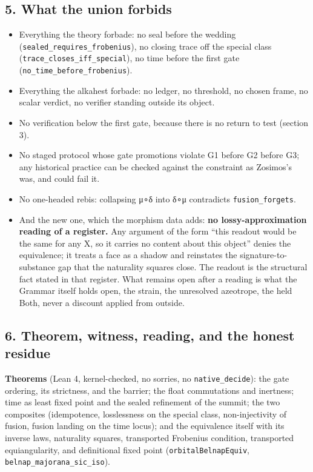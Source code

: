 \documentclass[12pt,a4paper]{article}
\begin{document}
\hypertarget{what-the-union-forbids}{%
\subsection{5. What the union forbids}\label{what-the-union-forbids}}

\begin{itemize}
\tightlist
\item
  Everything the theory forbade: no seal before the wedding
  (\texttt{sealed\_requires\_frobenius}), no closing trace off the
  special class (\texttt{trace\_closes\_iff\_special}), no time before
  the first gate (\texttt{no\_time\_before\_frobenius}).
\item
  Everything the alkahest forbade: no ledger, no threshold, no chosen
  frame, no scalar verdict, no verifier standing outside its object.
\item
  No verification below the first gate, because there is no return to
  test (section 3).
\item
  No staged protocol whose gate promotions violate G1 before G2 before
  G3; any historical practice can be checked against the constraint as
  Zosimos's was, and could fail it.
\item
  No one-headed rebis: collapsing μ∘δ into δ∘μ contradicts
  \texttt{fusion\_forgets}.
\item
  And the new one, which the morphism data adds: \textbf{no
  lossy-approximation reading of a register.} Any argument of the form
  ``this readout would be the same for any X, so it carries no content
  about this object'' denies the equivalence; it treats a face as a
  shadow and reinstates the signature-to-substance gap that the
  naturality squares close. The readout is the structural fact stated in
  that register. What remains open after a reading is what the Grammar
  itself holds open, the strain, the unresolved azeotrope, the held
  Both, never a discount applied from outside.
\end{itemize}

\hypertarget{theorem-witness-reading-and-the-honest-residue}{%
\subsection{6. Theorem, witness, reading, and the honest
residue}\label{theorem-witness-reading-and-the-honest-residue}}

\textbf{Theorems} (Lean 4, kernel-checked, no sorries, no
\texttt{native\_decide}): the gate ordering, its strictness, and the
barrier; the float commutations and inertness; time as least fixed point
and the sealed refinement of the summit; the two composites
(idempotence, losslessness on the special class, non-injectivity of
fusion, fusion landing on the time locus); and the equivalence itself
with its inverse laws, naturality squares, transported Frobenius
condition, transported equiangularity, and definitional fixed point
(\texttt{orbitalBelnapEquiv}, \texttt{belnap\_majorana\_sic\_iso}).
\end{document}
